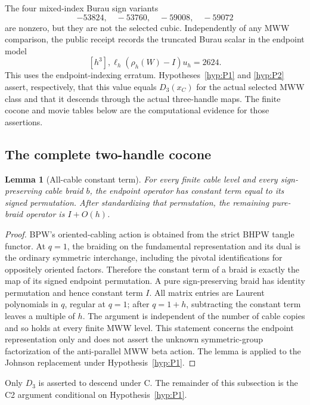 \documentclass[11pt]{amsart}
\newtheorem{lemma}[theorem]{Lemma}
\theoremstyle{definition}
\theoremstyle{remark}
\begin{document}
The four mixed-index Burau sign variants
\[
-53824,\quad -53760,\quad -59008,\quad -59072
\]
are nonzero, but they are not the selected cubic.  Independently of any MWW
comparison, the public receipt records the truncated Burau scalar in the
endpoint model
\begin{equation}\label{eq:selectedD3}
[h^3],\ell_h(\rho_h(W)-I)u_h=2624.
\end{equation}
This uses the endpoint-indexing erratum.  Hypotheses~\ref{hyp:P1} and
\ref{hyp:P2} assert, respectively, that this value equals $D_3(x_C)$ for the
actual selected MWW class and that it descends through the actual
three-handle maps.
The finite cocone and movie tables below are the computational evidence for
those assertions.

\subsection{The complete two-handle cocone}

\begin{lemma}[All-cable constant term]\label{lem:C2}
For every finite cable level and every sign-preserving cable braid \(b\),
the endpoint operator has constant term equal to its signed permutation.
After standardizing that permutation, the remaining pure-braid operator is
\(I+O(h)\).
\end{lemma}

\begin{proof}
BPW's oriented-cabling action is obtained from the strict BHPW tangle
functor.  At \(q=1\), the braiding on the fundamental representation and its
dual is the ordinary symmetric interchange, including the pivotal
identifications for oppositely oriented factors.  Therefore the constant
term of a braid is exactly the map of its signed endpoint permutation.  A
pure sign-preserving braid has identity permutation and hence constant term
\(I\).  All matrix entries are Laurent polynomials in \(q\), regular at
\(q=1\); after \(q=1+h\), subtracting the constant term leaves a multiple of
\(h\).  The argument is independent of the number of cable copies and so
holds at every finite MWW level.  This statement concerns the endpoint
representation only and does not assert the unknown symmetric-group
factorization of the anti-parallel MWW beta action.
The lemma is applied to the Johnson replacement under
Hypothesis~\ref{hyp:P1}.
\end{proof}

Only $D_3$ is asserted to descend under C.  The remainder of this subsection
is the C2 argument conditional on Hypothesis~\ref{hyp:P1}.
\end{document}
